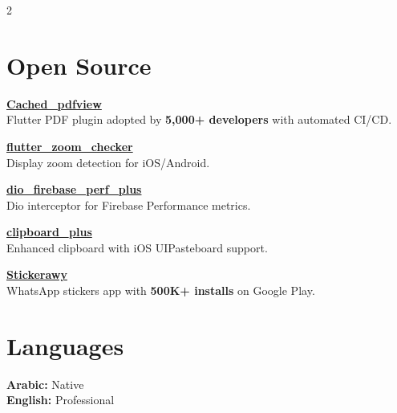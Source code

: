 \documentclass[10pt,a4paper]{article}
\begin{document}
\begin{paracol}{2}
        \section{Open Source}\label{sec:open-source}

        \textbf{\href{https://pub.dev/packages/flutter_cached_pdfview}{Cached\_pdfview}} \\
        Flutter PDF plugin adopted by \textbf{5,000+ developers} with automated CI/CD.

        \vspace{3pt}

        \textbf{\href{https://pub.dev/packages/flutter_zoom_checker}{flutter\_zoom\_checker}} \\
        Display zoom detection for iOS/Android.

        \vspace{3pt}

        \textbf{\href{https://github.com/binSaed/dio_firebase_performance_plus}{dio\_firebase\_perf\_plus}} \\
        Dio interceptor for Firebase Performance metrics.

        \vspace{3pt}

        \textbf{\href{https://pub.dev/packages/clipboard_plus}{clipboard\_plus}} \\
        Enhanced clipboard with iOS UIPasteboard support.

        \vspace{3pt}

        \textbf{\href{https://play.google.com/store/apps/details?id=com.stickerawy.stickers}{Stickerawy}} \\
        WhatsApp stickers app with \textbf{500K+ installs} on Google Play.

        \vspace{3pt}


        \section{Languages}\label{sec:languages}
        \textbf{Arabic:} Native \\
        \textbf{English:} Professional

        \vspace{2pt}

        \switchcolumn




\end{paracol}
\end{document}

